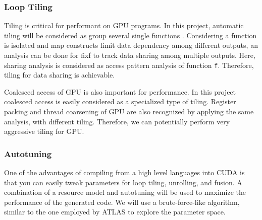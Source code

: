 \subsubsection{Loop Tiling}\label{loop-tiling}

Tiling is critical for performant on GPU programs. In this project,
automatic tiling will be considered as group several single functions
. Considering a function  is isolated and map constructs limit
data dependency among different outputs, an analysis can be done for
fix{f} to track data sharing among multiple outputs. Here,
sharing analysis is considered as access pattern analysis of function
\texttt{f}. Therefore, tiling for data sharing is achievable.

Coalesced access of GPU is also important for performance. In this
project coalesced access is easily considered as a specialized type of
tiling. Register packing and thread coarsening of GPU are also
recognized by applying the same analysis, with different tiling.
Therefore, we can potentially perform very aggressive tiling for GPU.

\subsubsection{Autotuning}\label{autotuning}

One of the advantages of compiling from a high level languages into CUDA
is that you can easily tweak parameters for loop tiling, unrolling, and
fusion. A combination of a resource model and autotuning will be used to
maximize the performance of the generated code. We will use a brute-force-like
algorithm, similar to the one employed by ATLAS\cite{atlas} to explore the
parameter space.
